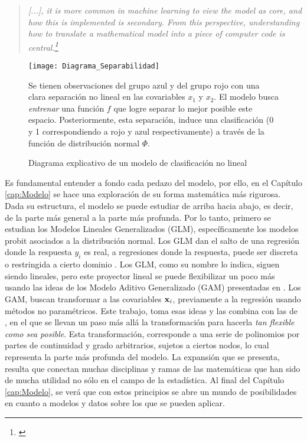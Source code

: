 \documentclass[../Main/Main.tex]{subfiles}
\begin{document}
\begin{quote}
	\textit{[...], it is more common in machine learning to view the model as core, and how this is implemented
is secondary. From this perspective, understanding how to translate a mathematical model into a piece of
computer code is central.\footnote{\citet{barber2012bayesian}}}
\end{quote}

\begin{figure}[h]
  \centering
      \texttt{[image: Diagrama\_Separabilidad]}
  \caption{Diagrama explicativo de un modelo de clasificación no lineal}
  \label{fig:DiagramaIntro}

  \medskip
  \begin{flushleft}
  \small
   Se tienen observaciones del grupo azul y del grupo rojo con una 	clara separación no lineal en las covariables $x_1$ y $x_2$. El modelo busca \textit{entrenar} una función $f$ que logre separar lo mejor posible este espacio. Posteriormente, esta separación, induce una clasificación (0 y 1 correspondiendo a rojo y azul respectivamente) a través de la función de distribución normal $\Phi$.
	\end{flushleft}  
\end{figure}

Es fundamental entender a fondo cada pedazo del modelo, por ello, en el Capítulo \ref{cap:Modelo} se hace una exploración de su forma matemática más rigurosa. Dada su estructura, el modelo  se puede estudiar de arriba hacia abajo, es decir, de la parte más general a la parte más profunda. Por lo tanto, primero se estudian los Modelos Lineales Generalizados (GLM), específicamente los modelos probit asociados a la distribución normal. Los GLM dan el salto de una regresión donde la respuesta $y_i$ es real, a regresiones donde la respuesta, puede ser discreta o restringida a cierto dominio \autocite{maccullagh1989generalized}. Los GLM, como su nombre lo indica, siguen siendo lineales, pero este proyector lineal se puede flexibilizar un poco más usando las ideas de los Modelo Aditivo Generalizado (GAM) presentadas en \citet{hastie1986generalized}. Los GAM, buscan transformar a las covariables $\mathbf{x}_i$, previamente a la regresión usando métodos no paramétricos. Este trabajo, toma esas ideas y las combina con las de \citet{mallik1998automatic}, en el que se llevan un paso más allá la transformación para hacerla \textit{tan flexible como sea posible}. Esta transformación, corresponde a una serie de polinomios por partes de continuidad y grado arbitrarios, sujetos a ciertos nodos, lo cual representa la parte más profunda del modelo. La expansión que se presenta, resulta que conectan muchas disciplinas y ramas de las matemáticas que han sido de mucha utilidad no sólo en el campo de la estadística. Al final del Capítulo \ref{cap:Modelo}, se verá que con estos principios se abre un mundo de posibilidades en cuanto a modelos y datos sobre los que se pueden aplicar.
\end{document}
